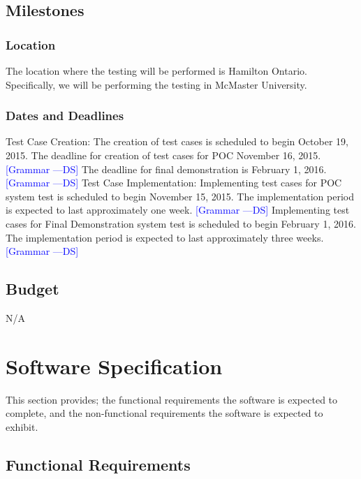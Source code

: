 \documentclass[12pt]{article}
\newcommand{\authornote}[3]{\textcolor{#1}{[#3 ---#2]}}
\newcommand{\authornote}[3]{}
\newcommand{\ds}[1]{\authornote{blue}{DS}{#1}}
\begin{document}
\subsection{Milestones}

\subsubsection{Location}
The location where the testing will be performed is Hamilton Ontario. Specifically, we will be performing the testing in McMaster University. 


\subsubsection{Dates and Deadlines}

Test Case Creation:
The creation of test cases is scheduled to begin October 19, 2015. The deadline for creation of test cases for POC November 16, 2015. 
\ds{Grammar}
The deadline for final demonstration is February 1, 2016.
\ds{Grammar}
\newline
\newline
Test Case Implementation:
Implementing test cases for POC system test is scheduled to begin November 15, 2015. The implementation period is expected to last approximately one week.
\ds{Grammar}
\newline
\newline
Implementing test cases for Final Demonstration system test is scheduled to begin February 1, 2016. The implementation period is expected to last approximately three weeks. 
\ds{Grammar}


\subsection{Budget}
N/A

%
%

\section{ Software Specification}
This section provides; the functional requirements the 
software is expected to complete, and the non-functional requirements the software is expected to exhibit.

\subsection{Functional Requirements}
\end{document}
